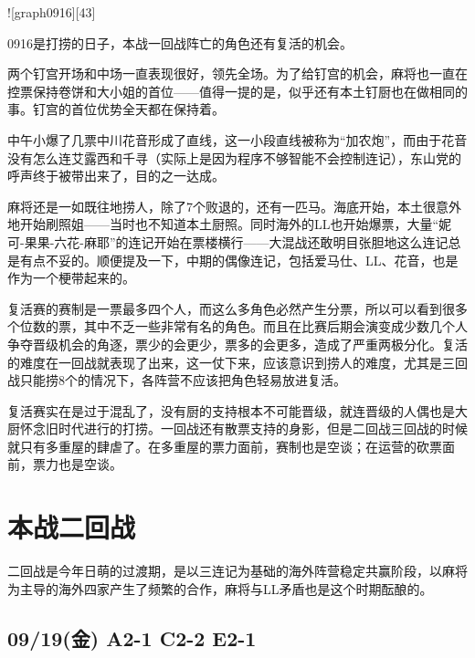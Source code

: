 ![graph0916][43]

0916是打捞的日子，本战一回战阵亡的角色还有复活的机会。

两个钉宫开场和中场一直表现很好，领先全场。为了给钉宫的机会，麻将也一直在控票保持卷饼和大小姐的首位——值得一提的是，似乎还有本土钉厨也在做相同的事。钉宫的首位优势全天都在保持着。

中午小爆了几票中川花音形成了直线，这一小段直线被称为“加农炮”，而由于花音没有怎么连艾露西和千寻（实际上是因为程序不够智能不会控制连记），东山党的呼声终于被带出来了，目的之一达成。

麻将还是一如既往地捞人，除了7个败退的，还有一匹马。海底开始，本土很意外地开始刷照姐——当时也不知道本土厨照。同时海外的LL也开始爆票，大量“妮可-果果-六花-麻耶”的连记开始在票楼横行——大混战还敢明目张胆地这么连记总是有点不妥的。顺便提及一下，中期的偶像连记，包括爱马仕、LL、花音，也是作为一个梗带起来的。

复活赛的赛制是一票最多四个人，而这么多角色必然产生分票，所以可以看到很多个位数的票，其中不乏一些非常有名的角色。而且在比赛后期会演变成少数几个人争夺晋级机会的角逐，票少的会更少，票多的会更多，造成了严重两极分化。复活的难度在一回战就表现了出来，这一仗下来，应该意识到捞人的难度，尤其是三回战只能捞8个的情况下，各阵营不应该把角色轻易放进复活。

复活赛实在是过于混乱了，没有厨的支持根本不可能晋级，就连晋级的人偶也是大厨怀念旧时代进行的打捞。一回战还有散票支持的身影，但是二回战三回战的时候就只有多重屋的肆虐了。在多重屋的票力面前，赛制也是空谈；在运营的砍票面前，票力也是空谈。

\section{本战二回战}

二回战是今年日萌的过渡期，是以三连记为基础的海外阵营稳定共赢阶段，以麻将为主导的海外四家产生了频繁的合作，麻将与LL矛盾也是这个时期酝酿的。

\subsection{09/19(金) A2-1 C2-2 E2-1}

